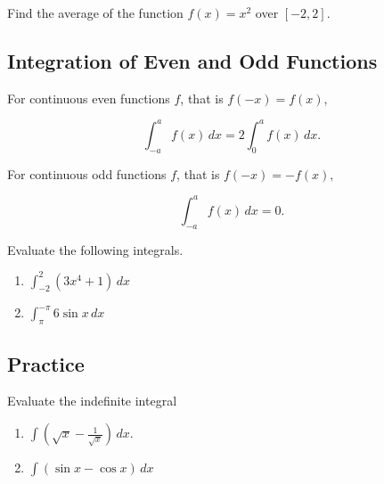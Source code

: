 

\begin{example}

Find the average of the function \(f(x)=x^2\) over \([-2, 2]\).

\end{example}
\vspace*{6\baselineskip}

\hypertarget{integration-of-even-and-odd-functions}{%
\subsection{Integration of Even and Odd
Functions}\label{integration-of-even-and-odd-functions}}

For continuous even functions \(f\), that is \(f(-x)=f(x)\),

\[\displaystyle \int^a_{-a}f(x)\,dx=2\int^a_0f(x)\,dx.\]

For continuous odd functions \(f\), that is \(f(-x)=-f(x),\)

\[\displaystyle \int^a_{-a}f(x)\,dx=0.\]

\begin{example}

Evaluate the following integrals.

\begin{enumerate}
\item
  \(\displaystyle \int^2_{-2}(3x^4+1)\,dx\)
\item
  \(\displaystyle \int_\pi^{-\pi} 6\sin x\, dx\)
\end{enumerate}

\end{example}

\subsection{Practice}

\begin{exercise}

Evaluate the indefinite integral

\begin{enumerate}
\item
  \(\displaystyle \int (\sqrt{x}-\frac{1}{\sqrt{x}})\,dx.\)
\item
  \(\displaystyle \int(\sin x-\cos x)\,dx\)
\end{enumerate}

\end{exercise}

